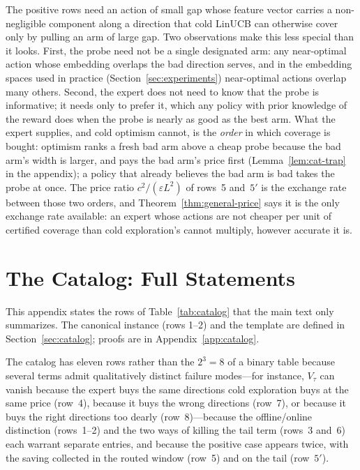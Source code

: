 \documentclass{article}
\theoremstyle{definition}
\theoremstyle{remark}
\newcommand{\eps}{\varepsilon}
\theoremstyle{remark}
\begin{document}
The positive rows need an action of small gap whose feature vector carries a
non-negligible component along a direction that cold LinUCB can otherwise
cover only by pulling an arm of large gap. Two observations make this less
special than it looks. First, the probe need not be a single designated arm:
any near-optimal action whose embedding overlaps the bad direction serves,
and in the embedding spaces used in practice (Section~\ref{sec:experiments})
near-optimal actions overlap many others. Second, the expert does not need to
know that the probe is informative; it needs only to prefer it, which any
policy with prior knowledge of the reward does when the probe is nearly as
good as the best arm. What the expert supplies, and cold optimism cannot, is
the \emph{order} in which coverage is bought: optimism ranks a fresh bad arm
above a cheap probe because the bad arm's width is larger, and pays the bad
arm's price first (Lemma~\ref{lem:cat-trap} in the appendix); a policy that
already believes the bad arm is bad takes the probe at once. The price ratio
$c^2/(\eps L^2)$ of rows~5 and~$5'$ is the exchange rate between those two
orders, and Theorem~\ref{thm:general-price} says it is the only exchange rate
available: an expert whose actions are not cheaper per unit of certified
coverage than cold exploration's cannot multiply, however accurate it is.

\section{The Catalog: Full Statements}
\label{app:catalog-statements}

This appendix states the rows of Table~\ref{tab:catalog} that the main text
only summarizes. The canonical instance (rows 1--2) and the template are
defined in Section~\ref{sec:catalog}; proofs are in Appendix~\ref{app:catalog}.

The catalog has eleven rows rather than the $2^3=8$ of a binary table
because several terms admit qualitatively distinct failure modes---for
instance, $V_\tau$ can vanish because the expert buys the same directions cold
exploration buys at the same price (row~4), because it buys the wrong
directions (row~7), or because it buys the right directions too dearly
(row~8)---because the offline/online distinction (rows~1--2) and the two
ways of killing the tail term (rows~3 and~6) each warrant separate entries,
and because the positive case appears twice, with the saving collected in
the routed window (row~5) and on the tail (row~$5'$).
\end{document}
